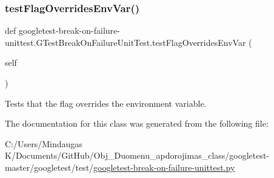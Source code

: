 \subsubsection{\texorpdfstring{testFlagOverridesEnvVar()}{testFlagOverridesEnvVar()}}
{\footnotesize\ttfamily def googletest-\/break-\/on-\/failure-\/unittest.\+G\+Test\+Break\+On\+Failure\+Unit\+Test.\+test\+Flag\+Overrides\+Env\+Var (\begin{DoxyParamCaption}\item[{}]{self }\end{DoxyParamCaption})}

\begin{DoxyVerb}Tests that the flag overrides the environment variable.\end{DoxyVerb}
 

The documentation for this class was generated from the following file\+:\begin{DoxyCompactItemize}
\item 
C\+:/\+Users/\+Mindaugas K/\+Documents/\+Git\+Hub/\+Obj\+\_\+\+Duomenu\+\_\+apdorojimas\+\_\+class/googletest-\/master/googletest/test/\mbox{\hyperlink{googletest-master_2googletest_2test_2googletest-break-on-failure-unittest_8py}{googletest-\/break-\/on-\/failure-\/unittest.\+py}}\end{DoxyCompactItemize}
